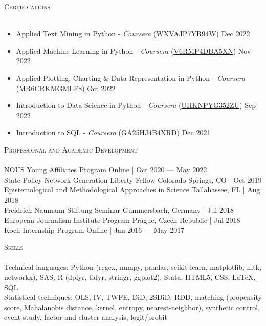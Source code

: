 \documentclass[a4paper,11pt]{article}
\newcommand{\lineunder} {
    \vspace*{-8pt} \\
    \hspace*{-18pt} \hrulefill \\
}
\newcommand{\header} [1] {
    {\hspace*{-18pt}\vspace*{6pt} \textsc{\large{#1}}}
    \vspace*{-6pt} \lineunder
}
\begin{document}
\vspace{1mm}
\header{Certifications}
\begin{itemize}
    \item Applied Text Mining in Python - \emph{Coursera} (\href{https://www.coursera.org/account/accomplishments/verify/WXVAJP7YR94W}{WXVAJP7YR94W}) \hfill Dec 2022
    \item Applied Machine Learning in Python - \emph{Coursera} (\href{https://www.coursera.org/account/accomplishments/certificate/V6RMP4DBA5XN}{V6RMP4DBA5XN}) \hfill Nov 2022
    \item Applied Plotting, Charting \& Data Representation in Python - \emph{Coursera} (\href{https://www.coursera.org/account/accomplishments/certificate/MR6CRKMGMLF8}{MR6CRKMGMLF8}) \hfill Oct 2022
    \item Introduction to Data Science in Python - \emph{Coursera} (\href{https://www.coursera.org/account/accomplishments/certificate/UHKNPYG352ZU}{UHKNPYG352ZU}) \hfill Sep 2022
    \item Introduction to SQL - \emph{Coursera} (\href{https://coursera.org/verify/GA25HJ4B4XRD}{GA25HJ4B4XRD}) \hfill Dec 2021
\end{itemize}
\vspace{1mm}
\header{Professional and Academic Development}

NOUS Young Affiliates Program \hfill Online | Oct 2020 --- May 2022 \\

State Policy Network Generation Liberty Fellow \hfill Colorado Springs, CO | Oct 2019 \\

Epistemological and Methodological Approaches in Science \hfill Tallahassee, FL | Aug 2018\\

Freidrich Naumann Stiftung Seminar \hfill Gummersbach, Germany | Jul 2018 \\

European Journalism Institute Program \hfill Prague, Czech Republic | Jul 2018 \\

Koch Internship Program \hfill Online | Jan 2016 --- May 2017

\vspace{1mm}
\header{Skills}
Technical languages: Python (regex, numpy, pandas, scikit-learn, matplotlib, nltk, networkx), SAS, R (dplyr, tidyr, stringr, ggplot2), Stata, HTML5, CSS, \LaTeX, SQL \\

Statistical techniques: OLS, IV, TWFE, DiD, 2SDiD, RDD, matching (propensity score, Mahalanobis distance, kernel, entropy, nearest-neighbor), synthetic control, event study, factor and cluster analysis, logit/probit
\end{document}

